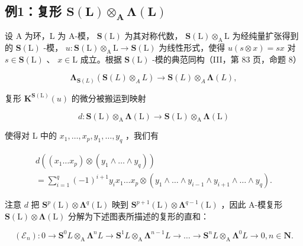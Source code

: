 \subsection{\texorpdfstring{例1：复形 \(\mathbf{S}(\mathbf{L})\otimes_{\mathbf{A}}\boldsymbol{\Lambda}(\mathbf{L})\)}{例1：复形 \textbackslash mathbf\{S\}(\textbackslash mathbf\{L\})\textbackslash otimes\_\{\textbackslash mathbf\{A\}\}\textbackslash boldsymbol\{\textbackslash Lambda\}(\textbackslash mathbf\{L\})}}

设 A 为环，L 为 A-模， \(\mathbf{S}(\mathrm{L})\) 为其对称代数， \(\mathbf{S}(\mathrm{L}) \otimes_{\mathrm{A}} \mathrm{L}\) 为经纯量扩张得到的 \(\mathbf{S}(\mathrm{L})\) -模， \(u: \mathbf{S}(\mathrm{L}) \otimes_{\mathrm{A}} \mathrm{L} \to \mathbf{S}(\mathrm{L})\) 为线性形式，使得 \(u(s \otimes x) = sx\) 对 \(s \in \mathbf{S}(\mathrm{L})\) 、 \(x \in \mathrm{L}\) 成立。根据 \(\mathbf{S}(\mathrm{L})\) -模的典范同构（III，第 83 页，命题 8）

\[
\boldsymbol {\Lambda} _ {\mathbf {S} (L)} (\mathbf {S} (L) \otimes_ {A} L) \rightarrow \mathbf {S} (L) \otimes_ {A} \boldsymbol {\Lambda} (L),
\]

复形 \(\mathbf{K}^{\mathbf{S}(\mathrm{L})}(u)\) 的微分被搬运到映射

\[
d: \mathbf {S} (\mathrm{L}) \otimes_ {\mathrm{A}} \boldsymbol {\Lambda} (\mathrm{L}) \rightarrow \mathbf {S} (\mathrm{L}) \otimes_ {\mathrm{A}} \boldsymbol {\Lambda} (\mathrm{L})
\]

使得对 L 中的 \(x_{1},\ldots,x_{p},y_{1},\ldots,y_{q}\) ，我们有

\[
\begin{array}{l} d \left(\left(x _ {1} \dots x _ {p}\right) \otimes \left(y _ {1} \wedge \dots \wedge y _ {q}\right)\right) \\ = \sum_ {i = 1} ^ {q} (- 1) ^ {i + 1} y _ {i} x _ {1} \dots x _ {p} \otimes \left(y _ {1} \wedge \dots \wedge y _ {i - 1} \wedge y _ {i + 1} \wedge \dots \wedge y _ {q}\right). \end{array}
\]

注意 \(d\) 把 \(\mathbf{S}^{p}(\mathrm{L})\otimes\symbf{\Lambda}^{q}(\mathrm{L})\) 映到 \(\mathbf{S}^{p+1}(\mathrm{L})\otimes\symbf{\Lambda}^{q-1}(\mathrm{L})\) ，因此 A-模复形 \(\mathbf{S}(\mathrm{L})\otimes\symbf{\Lambda}(\mathrm{L})\) 分解为下述图表所描述的复形的直和：

\[
\left(\mathcal {E} _ {n}\right): 0 \rightarrow \mathbf {S} ^ {0} L \otimes_ {\mathrm{A}} \boldsymbol {\Lambda} ^ {n} L \rightarrow \mathbf {S} ^ {1} L \otimes_ {\mathrm{A}} \boldsymbol {\Lambda} ^ {n - 1} L \rightarrow \dots \rightarrow \mathbf {S} ^ {n} L \otimes_ {\mathrm{A}} \boldsymbol {\Lambda} ^ {0} L \rightarrow 0, n \in \mathbf {N}.
\]


